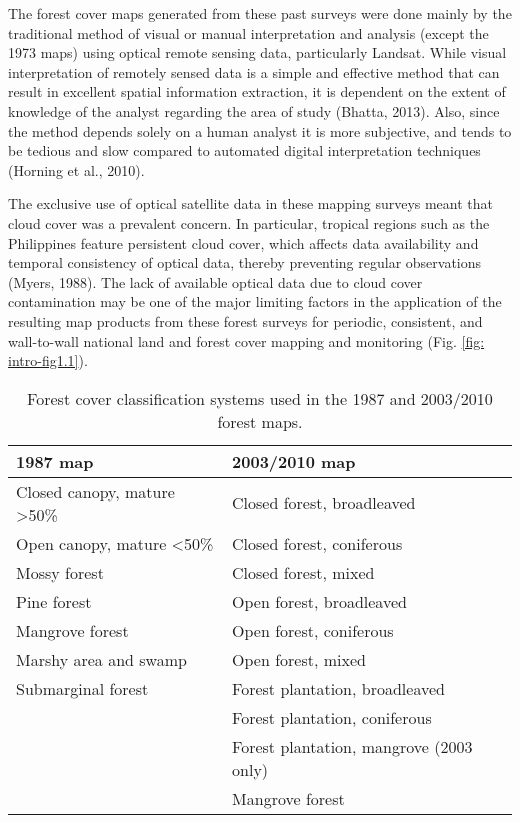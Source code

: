 The forest cover maps generated from these past surveys were done mainly by the traditional method of visual or manual interpretation and analysis (except the 1973 maps) using optical remote sensing data, particularly Landsat. While visual interpretation of remotely sensed data is a simple and effective method that can result in excellent spatial information extraction, it is dependent on the extent of knowledge of the analyst regarding the area of study (Bhatta, 2013). Also, since the method depends solely on a human analyst it is more subjective, and tends to be tedious and slow compared to automated digital interpretation techniques (Horning et al., 2010).

The exclusive use of optical satellite data in these mapping surveys meant that cloud cover was a prevalent concern. In particular, tropical regions such as the Philippines feature persistent cloud cover, which affects data availability and temporal consistency of optical data, thereby preventing regular observations (Myers, 1988). The lack of available optical data due to cloud cover contamination may be one of the major limiting factors in the application of the resulting map products from these forest surveys for periodic, consistent, and wall-to-wall national land and forest cover mapping and monitoring (Fig. \ref{fig: intro-fig1.1}).\\

\begin{spacing}{1.0}
\begin{longtable}[h!]{ p{7cm} p{7cm} }

    \caption[Forest cover classification systems used in the 1987, 2003, 2010 maps.]{Forest cover classification systems used in the 1987 and 2003/2010 forest maps.}
    \label{tab: intro-table1.2}\\
    
    	\toprule
    	1987 map & 2003/2010 map\\ 
    	\midrule
    	\endhead
    	
		Closed canopy, mature \textgreater 50\% & Closed forest, broadleaved\\
		Open canopy, mature \textless 50\% & Closed forest, coniferous\\
		Mossy forest & Closed forest, mixed\\
		Pine forest & Open forest, broadleaved\\
		Mangrove forest & Open forest, coniferous\\
		Marshy area and swamp & Open forest, mixed\\
		Submarginal forest & Forest plantation, broadleaved\\ 
		{} & Forest plantation, coniferous\\
		{} & Forest plantation, mangrove (2003 only)\\ 
		{} & Mangrove forest\\ 

    	\bottomrule
    
\end{longtable}	
\end{spacing}

